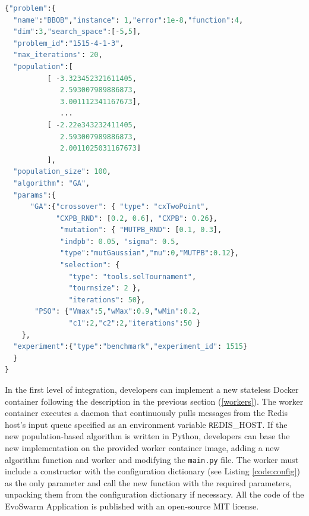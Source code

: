 \documentclass[review]{elsarticle}
\begin{document}
\begin{lstlisting}[language=Python, caption = Configuration message example, label=code:config]
{"problem":{
  "name":"BBOB","instance": 1,"error":1e-8,"function":4,
  "dim":3,"search_space":[-5,5],
  "problem_id":"1515-4-1-3",
  "max_iterations": 20,
  "population":[
          [ -3.323452321611405, 
             2.593007989886873, 
             3.001112341167673],
             ...
          [ -2.22e343232411405, 
             2.593007989886873, 
             2.0011025031167673] 
          ],
  "population_size": 100,
  "algorithm": "GA",  
  "params":{
      "GA":{"crossover": { "type": "cxTwoPoint", 
            "CXPB_RND": [0.2, 0.6], "CXPB": 0.26},
             "mutation": { "MUTPB_RND": [0.1, 0.3], 
             "indpb": 0.05, "sigma": 0.5, 
             "type":"mutGaussian","mu":0,"MUTPB":0.12},
             "selection": { 
               "type": "tools.selTournament", 
               "tournsize": 2 },
               "iterations": 50},
       "PSO": {"Vmax":5,"wMax":0.9,"wMin":0.2,
               "c1":2,"c2":2,"iterations":50 } 
    },
  "experiment":{"type":"benchmark","experiment_id": 1515}
  }
}
\end{lstlisting}

In the first level of integration, developers
can implement a new stateless Docker container following
the description in the previous section (\ref{workers}). The worker
container executes a daemon that continuously pulls messages from the Redis host's input queue
specified as an environment variable {\texttt REDIS\_HOST}. If the new
population-based algorithm is written in Python, developers can base the new
implementation on the provided worker container image, adding a new algorithm
function and worker and modifying the \texttt{main.py} file. 
The worker must include a constructor with the configuration dictionary 
(see Listing \ref{code:config}) as the only parameter and call the new function 
with the required parameters, unpacking them from the configuration dictionary if necessary.
All the code of the EvoSwarm Application is published with an open-source MIT license.
\end{document}
